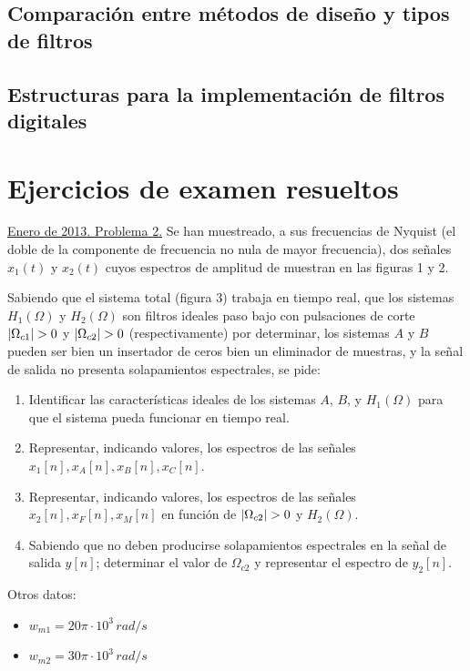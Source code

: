 \documentclass[a4paper,oneside]{book}
\begin{document}
\section{Comparación entre métodos de diseño y tipos de filtros}

\section{Estructuras para la implementación de filtros digitales}

\chapter{Ejercicios de examen resueltos}

\ejemplo
{ %
	\underline{Enero de 2013. Problema 2.} Se han muestreado, a sus frecuencias de Nyquist (el doble de la componente de frecuencia no nula de mayor frecuencia), dos señales $x_1(t)$ y $x_2(t)$ cuyos espectros de amplitud de muestran en las figuras 1 y 2.

	Sabiendo que el sistema total (figura 3) trabaja en tiempo real, que los sistemas $H_1(\Omega)$ y $H_2(\Omega)$ son filtros ideales paso bajo con pulsaciones de corte $\abs{\Omega_{c1}}>0$ y $\abs{\Omega_{c2}}>0$ (respectivamente) por determinar, los sistemas $A$ y $B$ pueden ser bien un insertador de ceros bien un eliminador de muestras, y la señal de salida no presenta solapamientos espectrales, se pide:

	\begin{enumerate}[label=\alph*)]
		 \item Identificar las características ideales de los sistemas $A$, $B$, y $H_1(\Omega)$ para que el sistema pueda funcionar en tiempo real.
		 \item Representar, indicando valores, los espectros de las señales $x_1[n], x_A[n], x_B[n], x_C[n]$.
		 \item Representar, indicando valores, los espectros de las señales $x_2[n], x_F[n], x_M[n]$ en función de $\abs{\Omega_{c2}}>0$ y $H_2(\Omega)$.
		 \item Sabiendo que no deben producirse solapamientos espectrales en la señal de salida $y[n]$; determinar el valor de $\Omega_{c2}$ y representar el espectro de $y_2[n]$.
	\end{enumerate}

	Otros datos:
	\begin{itemize}
		\item $w_{m1} = 20\pi \cdot 10^{3} \, \unit{rad/s}$
		\item $w_{m2} = 30\pi \cdot 10^{3} \, \unit{rad/s}$
	\end{itemize}
}
\end{document}
